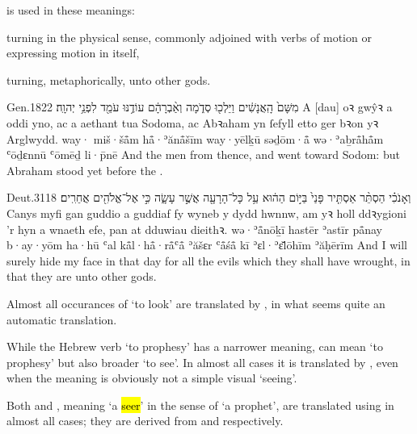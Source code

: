 \begin{paper}
	 is used in these meanings:
	\begin{compactitem}
		\item turning in the physical sense, commonly adjoined with verbs of motion or expressing motion in itself,
		\item turning, metaphorically, unto other gods.
	\end{compactitem}
\end{paper}

\begin{example}{Gen.}{18}{22}{}{}
	\quoling
	{ מִשָּׁם֙ הָֽאֲנָשִׁ֔ים וַיֵּלְכ֖וּ סְדֹ֑מָה וְאַ֨בְרָהָ֔ם עוֹדֶ֥נּוּ עֹמֵ֖ד לִפְנֵ֥י יְהוָֽה׃}
	{A [dau] oꝛ gwŷꝛ a  oddi yno, ac a aethant tua Sodoma, ac Abꝛaham yn ſefyll  etto ger bꝛon yꝛ Arglwydd.}
	{way· miš·šå̄m hå̄·ʾănå̄šīm way·yēlḵū səḏōm·å̄ wə·ʾaḇrå̄hå̄m ʿōḏɛnnū ʿōmēḏ li·p̄nē {\YHWH}}
	{And the men  from thence, and went toward Sodom: but Abraham stood yet before the {\LORD}.}
\end{example}

\begin{example}{Deut.}{31}{18}{}{}
	\quoling
	{וְאָנֹכִ֗י הַסְתֵּ֨ר אַסְתִּ֤יר פָּנַי֙ בַּיּ֣וֹם הַה֔וּא עַ֥ל כָּל־הָרָעָ֖ה אֲשֶׁ֣ר עָשָׂ֑ה כִּ֣י  אֶל־אֱלֹהִ֖ים אֲחֵרִֽים׃}
	{Canys myfi gan guddio a guddiaf fy wyneb y dydd hwnnw, am yꝛ holl ddꝛygioni ’r hyn a wnaeth efe, pan  at dduwiau dieithꝛ.}
	{wə·ʾå̄nōḵī hastēr ʾastīr på̄nay b·ay·yōm ha·hū ʿal kå̄l·hå̄·rå̄ʿå̄ ʾăšɛr ʿå̄śå̄ kī  ʾɛl·ʾɛ̆lōhīm ʾăḥērīm}
	{And I will surely hide my face in that day for all the evils which they shall have wrought, in that they are  unto other gods.}
\end{example}




Almost all occurances of  ‘to look’ are translated by , in what seems quite an automatic translation.




\begin{paper}
	{\click} While the Hebrew verb  ‘to prophesy’ has a narrower meaning,  can mean ‘to prophesy’ but also broader ‘to see’. In almost all cases it is translated by , even when the meaning is obviously not a simple visual ‘seeing’.

	Both  and , meaning ‘a \hl{seer}’ in the sense of ‘a prophet’, are translated using  in almost all cases; they are derived from  and  respectively.
\end{paper}

